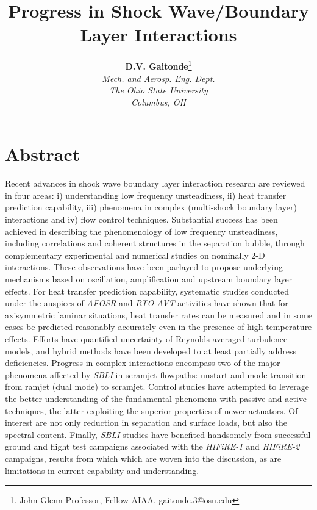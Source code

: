 \documentclass[subfigmatrix]{aiaa-tc}%
\title{Progress in Shock Wave/Boundary Layer Interactions}
\author{
\begin{tabular}{c}
{\bf D.V. Gaitonde}\thanks{John Glenn Professor, Fellow AIAA, gaitonde.3@osu.edu} \\ 
{\itshape Mech. and Aerosp. Eng. Dept.} \\
{\itshape The Ohio State University}  \\ 
{\itshape Columbus, OH} 
\end{tabular}
}
\begin{document}
\maketitle

\section*{Abstract} 
Recent advances in shock wave boundary layer interaction research are
reviewed in four areas: i) understanding low frequency unsteadiness,
ii) heat transfer prediction capability, iii) phenomena in complex
(multi-shock boundary layer) interactions and iv) flow control
techniques.  Substantial success has been achieved in describing the
phenomenology of low frequency unsteadiness, including correlations
and coherent structures in the separation bubble, through
complementary experimental and numerical studies on nominally
\mbox{2-D} interactions.  These observations have been parlayed to
propose underlying mechanisms based on oscillation, amplification and
upstream boundary layer effects.  For heat transfer prediction
capability, systematic studies conducted under the auspices of {\em
  AFOSR} and {\em RTO-AVT} activities have shown that for axisymmetric
laminar situations, heat transfer rates can be measured and in some
cases be predicted reasonably accurately even in the presence of
high-temperature effects. Efforts have quantified uncertainty of
Reynolds averaged turbulence models, and hybrid methods have been
developed to at least partially address deficiencies.  Progress in
complex interactions encompass two of the major phenomena affected by
{\em SBLI} in scramjet flowpaths: unstart and mode transition from
ramjet (dual mode) to scramjet.  Control studies have attempted to
leverage the better understanding of the fundamental phenomena with
passive and active techniques, the latter exploiting the superior
properties of newer actuators. Of interest are not only reduction in
separation and surface loads, but also the spectral content. Finally,
{\em SBLI} studies have benefited handsomely from successful ground
and flight test campaigns associated with the {\em HIFiRE-1} and {\em
  HIFiRE-2} campaigns, results from which which are woven into the
discussion, as are limitations in current capability and
understanding.




\end{document}
